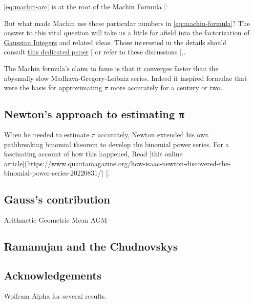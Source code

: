 \documentclass[
  a4paper,
]{article}
\begin{document}
\cref{eq:machin-arc} is at the root of the Machin Formula
{[}\citeproc{ref-machin-like-wiki}{25}{]}:

But what made Machin use these particular numbers in
\cref{eq:machin-formula}? The answer to this vital question will take us
a little far afield into the factorization of
\href{https://en.wikipedia.org/wiki/Gaussian_integer}{Gaussian Integers}
and related ideas. Those interested in the details should consult
\href{https://www2.oberlin.edu/faculty/jcalcut/gausspi.pdf}{this
dedicated paper} {[}\citeproc{ref-calcut2009}{26}{]} or refer to these
discussions
{[},\citeproc{ref-mse-machin-two}{28}{]}.

The Machin formula's claim to fame is that it converges faster than the
abysmally slow Madhava-Gregory-Leibniz series. Indeed it inspired
formulae that were the basis for approximating \(\pi\) more accurately
for a century or two.

\subsection{Newton's approach to estimating
π}\label{newtons-approach-to-estimating-ux3c0}

When he needed to estimate \(\pi\) accurately, Newton extended his own
pathbreaking binomial theorem to develop the binomial power series. For
a fascinating account of how this happened, Read {[}this online
article{[}(https://www.quantamagazine.org/how-isaac-newton-discovered-the-binomial-power-series-20220831/)
{[}\citeproc{ref-strogatz-newton-2022}{29}{]}.

\subsection{Gauss's contribution}\label{gausss-contribution}

Arithmetic-Geometric Mean AGM

\subsection{Ramanujan and the
Chudnovskys}\label{ramanujan-and-the-chudnovskys}

\subsection{Acknowledgements}\label{acknowledgements}

Wolfram Alpha for several results.
\end{document}
